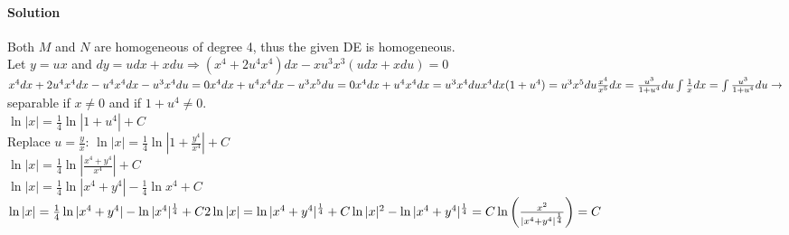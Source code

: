 \documentclass{article}
\begin{document}
\paragraph{Solution} Both $M$ and $N$ are homogeneous of degree 4, thus the given DE is homogeneous.
\\Let $y=ux$ and $dy=udx+xdu\Rightarrow(x^4+2u^4x^4)dx-xu^3x^3(udx+xdu)=0$
\\$x^4dx+2u^4x^4dx-u^4x^4dx-u^3x^4du=0
\\x^4dx+u^4x^4dx-u^3x^5du=0
\\x^4dx+u^4x^4dx=u^3x^4du
\\x^4dx(1+u^4)=u^3x^5du
\\\frac{x^4}{x^5}dx=\frac{u^3}{1+u^4}du
\\\int\frac{1}{x}dx=\int\frac{u^3}{1+u^4}du\to$separable if $x\neq0$ and if $1+u^4\neq0$.
\\$\ln|x|=\frac{1}{4}\ln|1+u^4|+C$
\\Replace $u=\frac{y}{x}$: $\ln|x|=\frac{1}{4}\ln|1+\frac{y^4}{x^4}|+C$
\\$\ln|x|=\frac{1}{4}\ln\left|\frac{x^4+y^4}{x^4}\right|+C$
\\$\ln|x|=\frac{1}{4}\ln|x^4+y^4|-\frac{1}{4}\ln{x^4}+C$
\\$\ln|x|=\frac{1}{4}\ln|x^4+y^4|-\ln|x^4|^{\frac{1}{4}}+C
\\2\ln|x|=\ln|x^4+y^4|^{\frac{1}{4}}+C
\\\ln|x|^2-\ln|x^4+y^4|^{\frac{1}{4}}=C
\\\ln\left(\frac{x^2}{|x^4+y^4|^{\frac{1}{4}}}\right)=C$
\end{document}
